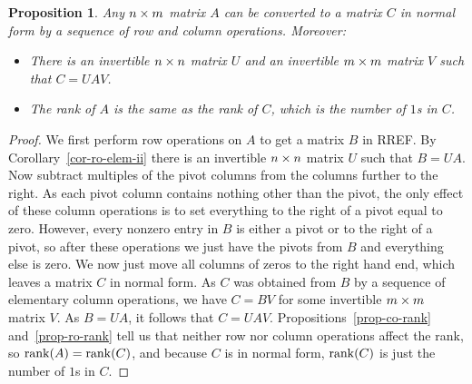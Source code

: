 \documentclass[reqno]{amsart}
\newtheorem{proposition}[theorem]{Proposition}
\theoremstyle{definition}
\begin{document}
\begin{proposition}\label{prop-normal-form}
 Any $n\times m$ matrix $A$ can be converted to a matrix $C$ in normal
 form by a sequence of row and column operations.  Moreover:
 \begin{itemize}
  \item[(a)] There is an invertible $n\times n$ matrix $U$ and an invertible
   $m\times m$ matrix $V$ such that $C=UAV$.
  \item[(b)] The rank of $A$ is the same as the rank of $C$, which is
   the number of $1$s in $C$.
 \end{itemize}
\end{proposition}
\begin{proof}
 We first perform row operations on $A$ to get a matrix $B$ in RREF.  By
 Corollary~\ref{cor-ro-elem-ii} there is an invertible $n\times n$ matrix
 $U$ such that $B=UA$.
 Now subtract multiples of the pivot columns from the
 columns further to the right.  As each pivot column contains nothing
 other than the pivot, the only effect of these column operations is
 to set everything to the right of a pivot equal to zero.  However,
 every nonzero entry in $B$ is either a pivot or to the right of a
 pivot, so after these operations we just have the pivots from $B$ and
 everything else is zero.  We now just move all columns of zeros to
 the right hand end, which leaves a matrix $C$ in normal form.  As $C$
 was obtained from $B$ by a sequence of elementary column operations,
 we have $C=BV$ for some invertible $m\times m$ matrix $V$.  As $B=UA$,
 it follows that $C=UAV$.  Propositions~\ref{prop-co-rank}
 and~\ref{prop-ro-rank} tell us that neither row nor column operations
 affect the rank, so $\operatorname{rank}(A)=\operatorname{rank}(C)$, and because $C$ is in normal
 form, $\operatorname{rank}(C)$ is just the number of $1$s in $C$.
\end{proof}
\end{document}
